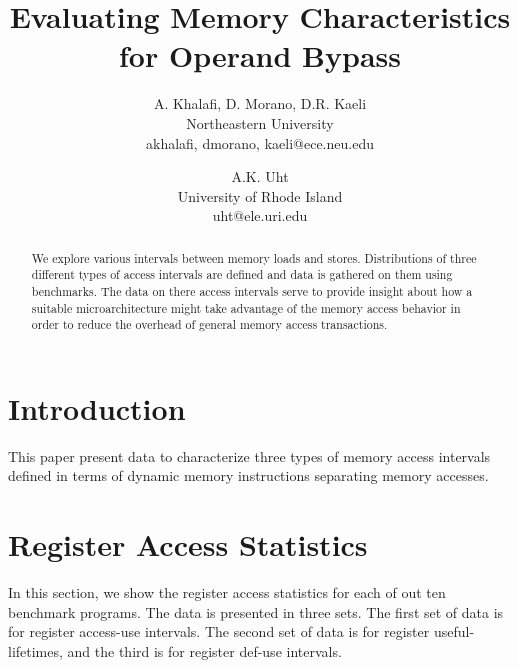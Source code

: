 \documentclass[10pt,twocolumn]{article}
\begin{document}
%
%
%
\title{Evaluating Memory Characteristics for Operand Bypass}
%
\author{
A. Khalafi, D. Morano, D.R. Kaeli\\
Northeastern University\\
{akhalafi, dmorano, kaeli}@ece.neu.edu\\
\and
A.K. Uht\\
University of Rhode Island\\ 
uht@ele.uri.edu
}
%
%
\date{}
%
\maketitle
%
%
%
\begin{abstract}
%
We explore various intervals between memory loads and stores.
Distributions of three different types of access intervals
are defined and data is gathered on them using benchmarks.
The data on there access intervals serve to provide insight
about how a suitable microarchitecture might take advantage
of the memory access behavior in order to reduce the overhead
of general memory access transactions.
%
\end{abstract}
%
%
\vspace{-0.25in}
\section{Introduction}
\vspace{-0.15in}
%
This paper present data to characterize three types of
memory access intervals defined in terms of dynamic memory
instructions separating memory accesses.




%
%
\vspace{-0.25in}
\section{Register Access Statistics}
\vspace{-0.15in}
%
In this section, we show the register access statistics for
each of out ten benchmark programs.
The data is presented in three sets.
The first set of data is for register access-use intervals.
The second set of data is for register useful-lifetimes, and
the third is for register def-use intervals.
\end{document}
